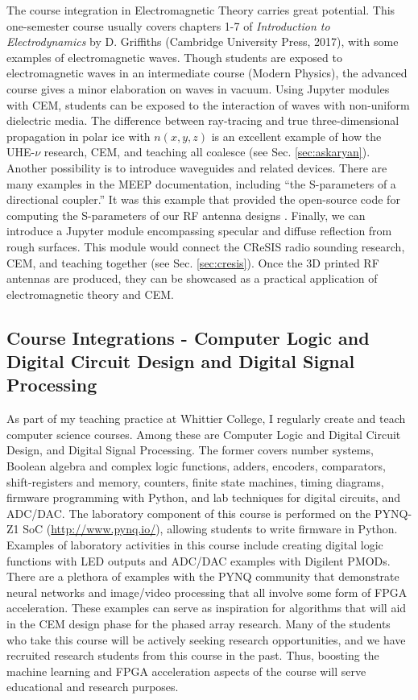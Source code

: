 \documentclass[../../main.tex]{subfiles}
\begin{document}
The course integration in Electromagnetic Theory carries great potential.  This one-semester course usually covers chapters 1-7 of \textit{Introduction to Electrodynamics} by D. Griffiths (Cambridge University Press, 2017), with some examples of electromagnetic waves.  Though students are exposed to electromagnetic waves in an intermediate course (Modern Physics), the advanced course gives a minor elaboration on waves in vacuum.  Using Jupyter modules with CEM, students can be exposed to the interaction of waves with non-uniform dielectric media.  The difference between ray-tracing and true three-dimensional propagation in polar ice with $n(x,y,z)$ is an excellent example of how the UHE-$\nu$ research, CEM, and teaching all coalesce (see Sec. \ref{sec:askaryan}).  Another possibility is to introduce waveguides and related devices.  There are many examples in the MEEP documentation, including ``the S-parameters of a directional coupler.''  It was this example that provided the open-source code for computing the S-parameters of our RF antenna designs \cite{meepcon2022}.  Finally, we can introduce a Jupyter module encompassing specular and diffuse reflection from rough surfaces.  This module would connect the CReSIS radio sounding research, CEM, and teaching together (see Sec. \ref{sec:cresis}).  Once the 3D printed RF antennas are produced, they can be showcased as a practical application of electromagnetic theory and CEM.  \\ \vspace{2.5mm}

\subsection{Course Integrations - Computer Logic and Digital Circuit Design and Digital Signal Processing}

As part of my teaching practice at Whittier College, I regularly create and teach computer science courses.  Among these are Computer Logic and Digital Circuit Design, and Digital Signal Processing.  The former covers number systems, Boolean algebra and complex logic functions, adders, encoders, comparators, shift-registers and memory, counters, finite state machines, timing diagrams, firmware programming with Python, and lab techniques for digital circuits, and ADC/DAC.  The laboratory component of this course is performed on the PYNQ-Z1 SoC (\url{http://www.pynq.io/}), allowing students to write firmware in Python.  Examples of laboratory activities in this course include creating digital logic functions with LED outputs and ADC/DAC examples with Digilent PMODs.  There are a plethora of examples with the PYNQ community that demonstrate neural networks and image/video processing that all involve some form of FPGA acceleration.  These examples can serve as inspiration for algorithms that will aid in the CEM design phase for the phased array research.  Many of the students who take this course will be actively seeking research opportunities, and we have recruited research students from this course in the past.  Thus, boosting the machine learning and FPGA acceleration aspects of the course will serve educational and research purposes. \\ \vspace{2.5mm}
\end{document}
